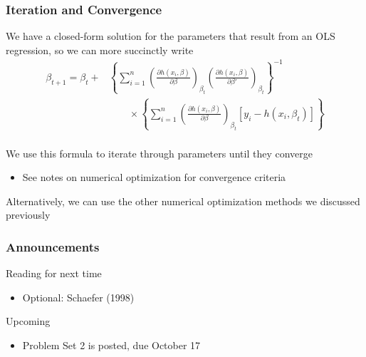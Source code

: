 \documentclass{beamer}
\begin{document}
\begin{frame}\frametitle{Iteration and Convergence}
    We have a closed-form solution for the parameters that result from an OLS regression, so we can more succinctly write
    \begin{align*}
    	\beta_{t + 1} = \beta_t + &\left\{ \sum_{i = 1}^n \left( \frac{\partial h(x_i, \beta)}{\partial \beta} \right)_{\beta_t} \left( \frac{\partial h(x_i, \beta)}{\partial \beta'} \right)_{\beta_t} \right\}^{-1} \\
    	& \qquad \times \left\{ \sum_{i = 1}^n \left( \frac{\partial h(x_i, \beta)}{\partial \beta} \right)_{\beta_t} [y_i - h(x_i, \beta_t)] \right\}
    \end{align*} \\
    \vspace{2ex}
    We use this formula to iterate through parameters until they converge 
    \begin{itemize}
    	\item See notes on numerical optimization for convergence criteria
    \end{itemize}
    \vspace{2ex}
    Alternatively, we can use the other numerical optimization methods we discussed previously
\end{frame}

\begin{frame}\frametitle{Announcements}
    Reading for next time
    \begin{itemize}
        \item Optional: Schaefer (1998)
    \end{itemize}
    \vspace{3ex}
    Upcoming
    \begin{itemize}
        \item Problem Set 2 is posted, due October 17
    \end{itemize}
\end{frame}
\end{document}

